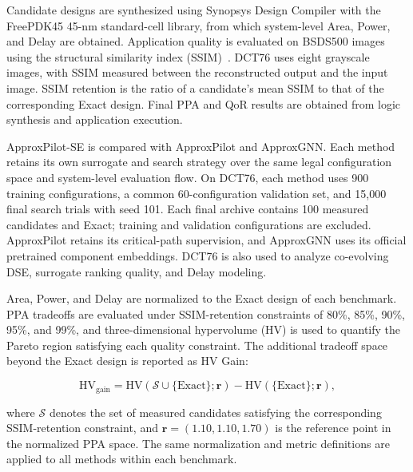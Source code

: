 Candidate designs are synthesized using Synopsys Design Compiler with the FreePDK45 45-nm standard-cell library, from which system-level Area, Power, and Delay are obtained. Application quality is evaluated on BSDS500 images~\cite{arbelaez2011contour} using the structural similarity index (SSIM)~\cite{wang2004ssim}. DCT76 uses eight grayscale images, with SSIM measured between the reconstructed output and the input image. SSIM retention is the ratio of a candidate's mean SSIM to that of the corresponding Exact design. Final PPA and QoR results are obtained from logic synthesis and application execution.

ApproxPilot-SE is compared with ApproxPilot and ApproxGNN. Each method retains its own surrogate and search strategy over the same legal configuration space and system-level evaluation flow. On DCT76, each method uses 900 training configurations, a common 60-configuration validation set, and 15,000 final search trials with seed 101. Each final archive contains 100 measured candidates and Exact; training and validation configurations are excluded. ApproxPilot retains its critical-path supervision, and ApproxGNN uses its official pretrained component embeddings. DCT76 is also used to analyze co-evolving DSE, surrogate ranking quality, and Delay modeling.

Area, Power, and Delay are normalized to the Exact design of each benchmark. PPA tradeoffs are evaluated under SSIM-retention constraints of 80\%, 85\%, 90\%, 95\%, and 99\%, and three-dimensional hypervolume (HV) is used to quantify the Pareto region satisfying each quality constraint. The additional tradeoff space beyond the Exact design is reported as HV Gain:

\begin{equation}
    \mathrm{HV}_{\mathrm{gain}}
    =
    \mathrm{HV}
    \left(
        \mathcal{S}\cup\{\mathrm{Exact}\};\mathbf{r}
    \right)
    -
    \mathrm{HV}
    \left(
        \{\mathrm{Exact}\};\mathbf{r}
    \right),
    \label{eq:hv_gain}
\end{equation}

where $\mathcal{S}$ denotes the set of measured candidates satisfying the corresponding SSIM-retention constraint, and $\mathbf{r}=(1.10,1.10,1.70)$ is the reference point in the normalized PPA space. The same normalization and metric definitions are applied to all methods within each benchmark.

























